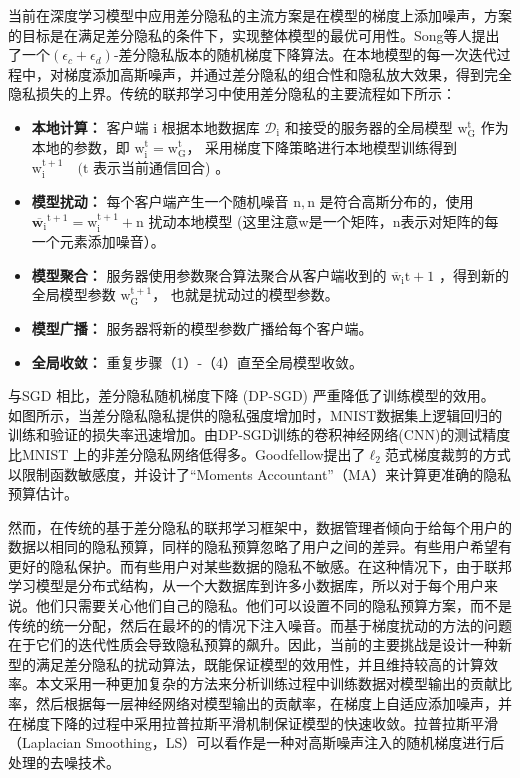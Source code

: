 当前在深度学习模型中应用差分隐私的主流方案是在模型的梯度上添加噪声，方案的目标是在满足差分隐私的条件下，实现整体模型的最优可用性。Song等人提出了一个$\left(\epsilon_{c}+\epsilon_{d}\right)$-差分隐私版本的随机梯度下降算法。在本地模型的每一次迭代过程中，对梯度添加高斯噪声，并通过差分隐私的组合性和隐私放大效果，得到完全隐私损失的上界。传统的联邦学习中使用差分隐私的主要流程如下所示：
\begin{itemize}
\item \textbf{本地计算：}
客户端 $\mathrm{i}$ 根据本地数据库 $\mathcal{D}_{\mathrm{i}}$ 和接受的服务器的全局模型 $\mathrm{w}_{\mathrm{G}}^{\mathrm{t}}$ 作为本地的参数，即 $\mathrm{w}_{\mathrm{i}}^{\mathrm{t}}=\mathrm{w}_{\mathrm{G}}^{\mathrm{t}}$， 采用梯度下降策略进行本地模型训练得到 $\mathrm{w}_{\mathrm{i}}^{\mathrm{t}+1} \quad(\mathrm{t}$ 表示当前通信回合) 。

\item \textbf{模型扰动：}
每个客户端产生一个随机噪音 $\mathrm{n},\mathrm{n}$ 是符合高斯分布的，使用 $\overline{\mathbf{w}_{\mathrm{i}}}^{\mathrm{t}+1}=\mathrm{w}_{\mathrm{i}}^{\mathrm{t}+1}+\mathrm{n}$ 扰动本地模型 (这里注意w是一个矩阵，n表示对矩阵的每一个元素添加噪音）。

\item \textbf{模型聚合：}
服务器使用参数聚合算法聚合从客户端收到的 $\overline{\mathrm{w}}_{\mathrm{i}} \mathrm{t}+1$ ，得到新的全局模型参数 $\mathrm{w}_{\mathrm{G}}^{\mathrm{t}+1}$， 也就是扰动过的模型参数。

\item \textbf{模型广播：}
服务器将新的模型参数广播给每个客户端。

\item \textbf{全局收敛：}
重复步骤（1）-（4）直至全局模型收敛。
\end{itemize}

与SGD 相比，差分隐私随机梯度下降 (DP-SGD) 严重降低了训练模型的效用。 如图所示，当差分隐私隐私提供的隐私强度增加时，MNIST数据集上逻辑回归的训练和验证的损失率迅速增加。由DP-SGD训练的卷积神经网络(CNN)的测试精度比MNIST 上的非差分隐私网络低得多。Goodfellow提出了$\ell_{2}$范式梯度裁剪的方式以限制函数敏感度，并设计了“Moments Accountant”（MA）来计算更准确的隐私预算估计。

然而，在传统的基于差分隐私的联邦学习框架中，数据管理者倾向于给每个用户的数据以相同的隐私预算，同样的隐私预算忽略了用户之间的差异。有些用户希望有更好的隐私保护。而有些用户对某些数据的隐私不敏感。在这种情况下，由于联邦学习模型是分布式结构，从一个大数据库到许多小数据库，所以对于每个用户来说。他们只需要关心他们自己的隐私。他们可以设置不同的隐私预算方案，而不是传统的统一分配，然后在最坏的的情况下注入噪音。而基于梯度扰动的方法的问题在于它们的迭代性质会导致隐私预算的飙升。因此，当前的主要挑战是设计一种新型的满足差分隐私的扰动算法，既能保证模型的效用性，并且维持较高的计算效率。本文采用一种更加复杂的方法来分析训练过程中训练数据对模型输出的贡献比率，然后根据每一层神经网络对模型输出的贡献率，在梯度上自适应添加噪声，并在梯度下降的过程中采用拉普拉斯平滑机制保证模型的快速收敛。拉普拉斯平滑（Laplacian Smoothing，LS）可以看作是一种对高斯噪声注入的随机梯度进行后处理的去噪技术。

